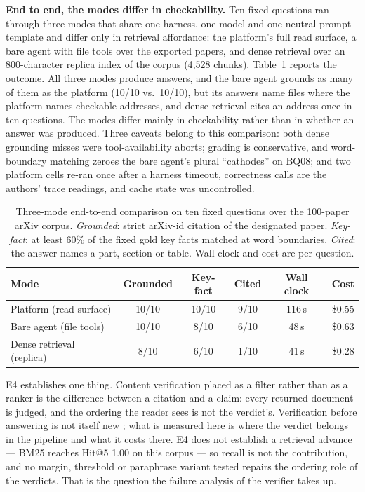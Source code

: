 \textbf{End to end, the modes differ in checkability.} Ten fixed questions ran
through three modes that share one harness, one model and one neutral prompt
template and differ only in retrieval affordance: the platform's full read
surface, a bare agent with file tools over the exported papers, and dense
retrieval over an 800-character replica index of the corpus (4{,}528 chunks).
Table~\ref{tab:e4-modes} reports the outcome. All three modes produce answers,
and the bare agent grounds as many of them as the platform
(10/10 vs.\ 10/10), but its answers name files where the platform names
checkable addresses, and dense retrieval cites an address once in ten
questions. The modes differ mainly in checkability rather than in whether an
answer was produced. Three caveats belong to this comparison: both dense
grounding misses were tool-availability aborts; grading is conservative, and
word-boundary matching zeroes the bare agent's plural ``cathodes'' on BQ08; and
two platform cells re-ran once after a harness timeout, correctness calls are
the authors' trace readings, and cache state was uncontrolled.

\begin{table}[!htbp]
\centering
\small
\setlength{\tabcolsep}{4pt}
\caption{Three-mode end-to-end comparison on ten fixed questions over the
100-paper arXiv corpus. \emph{Grounded}: strict arXiv-id citation of the
designated paper. \emph{Key-fact}: at least 60\% of the fixed gold key facts
matched at word boundaries. \emph{Cited}: the answer names a part, section or
table. Wall clock and cost are per question.}
\label{tab:e4-modes}
\begin{tabular}{lccccc}
\toprule
Mode & Grounded & Key-fact & Cited & Wall clock & Cost \\
\midrule
Platform (read surface)   & 10/10 & 10/10 & 9/10 & 116\,s & \$0.55 \\
Bare agent (file tools)   & 10/10 & 8/10  & 6/10 & 48\,s  & \$0.63 \\
Dense retrieval (replica) & 8/10  & 6/10  & 1/10 & 41\,s  & \$0.28 \\
\bottomrule
\end{tabular}
\end{table}

E4 establishes one thing. Content verification placed as a filter rather than
as a ranker is the difference between a citation and a claim: every returned
document is judged, and the ordering the reader sees is not the verdict's.
Verification before answering is not itself new \cite{selfrag,crag}; what is
measured here is where the verdict belongs in the pipeline and what it costs
there. E4 does not establish a retrieval advance --- BM25 reaches Hit@5 1.00
on this corpus --- so recall is not the contribution, and no margin, threshold
or paraphrase variant tested repairs the ordering role of the verdicts. That
is the question the failure analysis of the verifier takes up.

